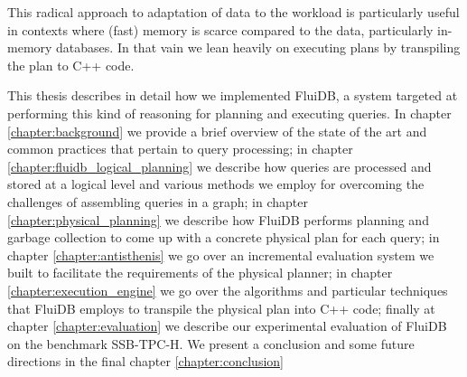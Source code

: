 This radical approach to adaptation of data to the workload is
particularly useful in contexts where (fast) memory is scarce compared
to the data, particularly in-memory databases. In that vain we lean
heavily on executing plans by transpiling the plan to C++ code.

This thesis describes in detail how we implemented FluiDB, a system
targeted at performing this kind of reasoning for planning and
executing queries. In chapter \ref{chapter:background} we provide a
brief overview of the state of the art and common practices that
pertain to query processing; in chapter
\ref{chapter:fluidb_logical_planning} we describe how queries are
processed and stored at a logical level and various methods we employ for
overcoming the challenges of assembling queries in a graph; in chapter
\ref{chapter:physical_planning} we describe how FluiDB performs
planning and garbage collection to come up with a concrete physical
plan for each query; in chapter \ref{chapter:antisthenis} we go over
an incremental evaluation system we built to facilitate the
requirements of the physical planner; in chapter
\ref{chapter:execution_engine} we go over the algorithms and
particular techniques that FluiDB employs to transpile the physical
plan into C++ code; finally at chapter \ref{chapter:evaluation} we
describe our experimental evaluation of FluiDB on the benchmark
SSB-TPC-H. We present a conclusion and some future directions in the
final chapter \ref{chapter:conclusion}
